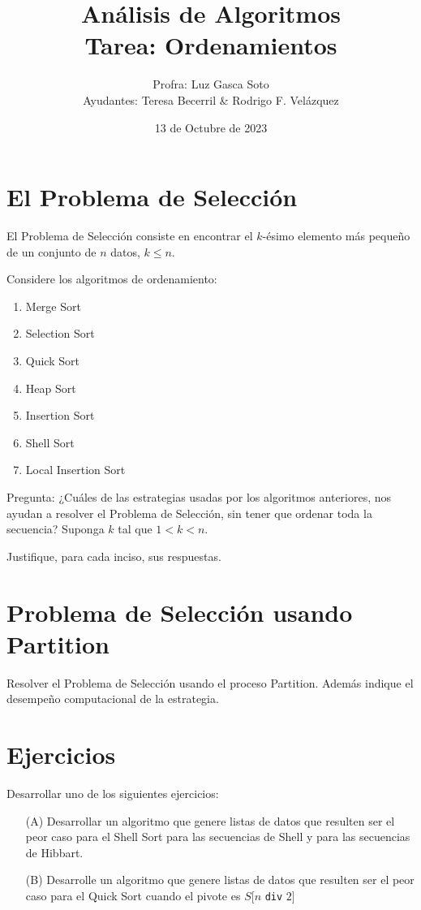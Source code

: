 \documentclass{article}
\title{Análisis de Algoritmos\\Tarea: Ordenamientos}
\author{Profra: Luz Gasca Soto\\Ayudantes: Teresa Becerril & Rodrigo F. Velázquez}
\date{13 de Octubre de 2023}
\begin{document}
\maketitle

\section{El Problema de Selección}

El Problema de Selección consiste en encontrar el $k$-ésimo elemento más pequeño de un conjunto de $n$ datos, $k \leq n$.

Considere los algoritmos de ordenamiento:
\begin{enumerate}
\item Merge Sort
\item Selection Sort
\item Quick Sort
\item Heap Sort
\item Insertion Sort
\item Shell Sort
\item Local Insertion Sort
\end{enumerate}

Pregunta: ¿Cuáles de las estrategias usadas por los algoritmos anteriores, nos ayudan a resolver el Problema de Selección, sin tener que ordenar toda la secuencia? Suponga $k$ tal que $1 < k < n$.

Justifique, para cada inciso, sus respuestas.

\section{Problema de Selección usando Partition}
Resolver el Problema de Selección usando el proceso Partition. Además indique el desempeño computacional de la estrategia.

\section{Ejercicios}
Desarrollar uno de los siguientes ejercicios:
\begin{enumerate}
\item[(A)] Desarrollar un algoritmo que genere listas de datos que resulten ser el peor caso para el Shell Sort para las secuencias de Shell y para las secuencias de Hibbart.

\item[(B)] Desarrolle un algoritmo que genere listas de datos que resulten ser el peor caso para el Quick Sort cuando el pivote es $S[n$ \verb|div| $2]$
\end{enumerate}
\end{document}
